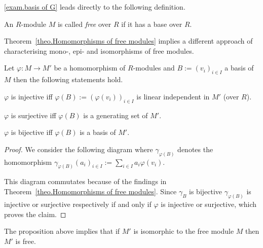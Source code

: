 \cref{exam.basis of G} leads directly to the following definition.
\begin{defin}
An $R$-module $M$ is called \emph{free} over $R$ if it has a base over $R$.
\end{defin}

Theorem~\ref{theo.Homomorphisms of free modules} implies a different approach of characterising mono-, epi- and isomorphisms of free modules.
\begin{cor}
Let $\varphi\colon M\to M'$ be a homomorphism of $R$-modules and $B:=(v_i)_{i\in I}$ a basis of $M$ then the following statements hold.
\begin{exlist}
\item $\varphi$ is injective iff $\varphi(B):=(\varphi(v_i))_{i\in I}$ is linear independent in $M'$ (over $R$).
\item $\varphi$ is surjective iff $\varphi(B)$ is a generating set of $M'$.
\item $\varphi$ is bijective iff $\varphi(B)$ is a basis of $M'$.
\end{exlist}
\end{cor}
\begin{proof}
We consider the following diagram where $\gamma_{\varphi(B)}$ denotes the homomorphism $\gamma_{\varphi(B)}(a_i)_{i\in I}:=\sum_{i\in I}a_i\varphi(v_i)$.
\begin{center}
\end{center}
This diagram commutates because of the findings in Theorem~\ref{theo.Homomorphisms of free modules}. Since $\gamma_B$ is bijective $\gamma_{\varphi(B)}$ is injective or surjective respectively if and only if $\varphi$ is injective or surjective, which proves the claim.
\end{proof}
The proposition above implies that if $M'$ is isomorphic to the free module $M$ then $M'$ is free.


